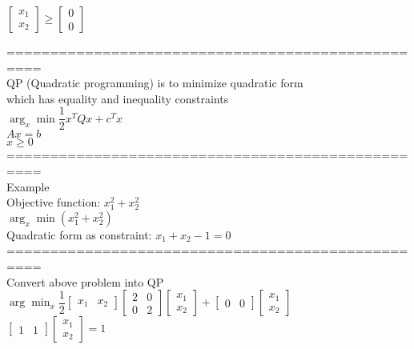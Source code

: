 \documentclass{article}
\begin{document}
$\begin{bmatrix}
x_1 \\ x_2
\end{bmatrix}
\ge
\begin{bmatrix}
0\\0
\end{bmatrix}$

==================================================\\
QP (Quadratic programming) is to minimize quadratic form \\ 
which has equality and inequality constraints \\ 

$\arg_x\min \dfrac{1}{2}x^TQx + c^Tx$ \\
$Ax = b$ \\
$x \ge 0$ \\

==================================================\\
Example \\ 

Objective function: $x_1^2 + x_2^2$ \\ 
$\arg_x\min (x_1^2 + x_2^2)$ \\ 

Quadratic form as constraint: $x_1 + x_2 - 1 = 0$ \\ 

==================================================\\
Convert above problem into QP \\ 
$\arg\min_x
\dfrac{1}{2}
\begin{bmatrix}
x_1 & x_2
\end{bmatrix}
\begin{bmatrix}
2 & 0 \\ 0 & 2
\end{bmatrix}
\begin{bmatrix}
x_1 \\ x_2
\end{bmatrix}
+ 
\begin{bmatrix}
0 & 0
\end{bmatrix}
\begin{bmatrix}
x_1 \\ x_2
\end{bmatrix}$ \\

$\begin{bmatrix}
1 & 1
\end{bmatrix}
\begin{bmatrix}
x_1 \\ x_2
\end{bmatrix} = 1$ \\
\end{document}
